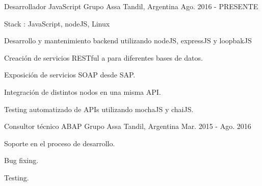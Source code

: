 


\begin{cventries}


\cventry
{Desarrollador JavaScript} %
{Grupo Assa} %
{Tandil, Argentina} %
{Ago. 2016 - PRESENTE} %
{ %
\begin{cvitems}
\item {Stack : JavaScript, nodeJS, Linux}
\item {Desarrollo y mantenimiento backend utilizando nodeJS, expressJS y loopbakJS}
\item {Creación de servicios RESTful a para diferentes bases de datos.}
\item {Exposición de servicios SOAP desde SAP.}
\item {Integración de distintos nodos en una misma API.}
\item {Testing automatizado de APIs utilizando mochaJS y chaiJS.}
\end{cvitems}
}

\cventry
{Consultor técnico ABAP} %
{Grupo Assa} %
{Tandil, Argentina} %
{Mar. 2015 - Ago. 2016} %
{ %
\begin{cvitems}
\item {Soporte en el proceso de desarrollo.}
\item {Bug fixing.}
\item {Testing.}
\end{cvitems}
}

\end{cventries}
